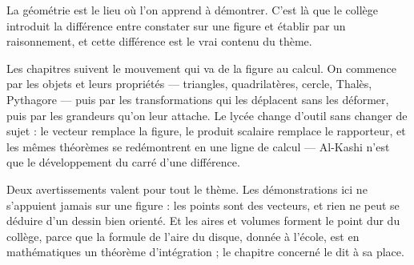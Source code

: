 La géométrie est le lieu où l'on apprend à démontrer. C'est là que le collège introduit la
différence entre constater sur une figure et établir par un raisonnement, et cette
différence est le vrai contenu du thème.

Les chapitres suivent le mouvement qui va de la figure au calcul. On commence par les objets
et leurs propriétés — triangles, quadrilatères, cercle, Thalès, Pythagore — puis par les
transformations qui les déplacent sans les déformer, puis par les grandeurs qu'on leur
attache. Le lycée change d'outil sans changer de sujet : le vecteur remplace la figure, le
produit scalaire remplace le rapporteur, et les mêmes théorèmes se redémontrent en une ligne
de calcul — Al-Kashi n'est que le développement du carré d'une différence.

Deux avertissements valent pour tout le thème. Les démonstrations ici ne s'appuient jamais
sur une figure : les points sont des vecteurs, et rien ne peut se déduire d'un dessin bien
orienté. Et les aires et volumes forment le point dur du collège, parce que la formule de
l'aire du disque, donnée à l'école, est en mathématiques un théorème d'intégration ; le
chapitre concerné le dit à sa place.
